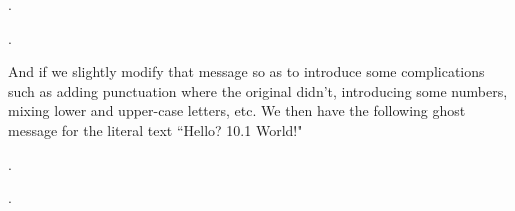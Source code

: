 \documentclass[a4paper, 18pt]{book} %
\begin{document}
{{{\vspace{2em}


     \begin{tcbverbatim}[title=Sample OUTPUT 1 from GM v1.1 --- for ``hello world"]
.        
     
            
            
               
                           
                       
               
                  
            
    
.
  \end{tcbverbatim}

\vspace{1em}


And if we slightly modify that message so as to introduce some complications such as adding punctuation where the original didn't, introducing some numbers, mixing lower and upper-case letters, etc. We then have the following ghost message for the literal text ``Hello? 10.1 World!"



\vspace{2em}


     \begin{tcbverbatim}[title=Sample OUTPUT 2 from GM v1.1 --- for ``Hello? 10.1 World!"]
.                                                              
     
            
            
               
                                       
                           
                             
                            
                                      
                             
                           
                                                                             
               
                  
            
    
                                               
.
  \end{tcbverbatim}

\vspace{1em}


}}}
\end{document}
